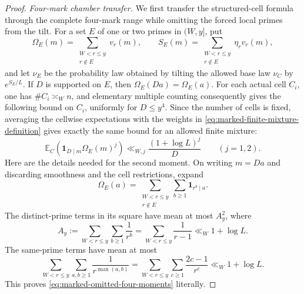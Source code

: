 \documentclass[11pt]{article}
\numberwithin{equation}{section}
\theoremstyle{definition}
\theoremstyle{remark}
\newcommand{\1}{\mathbf 1}
\begin{document}
\begin{proof}
\medskip\noindent\emph{Four-mark chamber transfer.}\quad
We first transfer the structured-cell formula through the complete
four-mark range while omitting the forced local primes from the tilt.
For a set \(E\) of one or two primes in \((W,y]\), put
\[
 \Omega_E(m)=\sum_{\substack{W<r\le y\\r\notin E}}v_r(m),
 \qquad
 S_E(m)=\sum_{\substack{W<r\le y\\r\notin E}}\eta_rv_r(m),
\]
and let \(\nu_E\) be the probability law obtained by tilting the allowed
base law \(\nu_C\) by \(e^{S_E/L}\).  If \(D\) is supported on \(E\),
then \(\Omega_E(Da)=\Omega_E(a)\).  For each actual cell \(C_i\), one has
\(\#C_i\asymp_W n\), and elementary multiple counting consequently gives
the following bound on \(C_i\), uniformly for \(D\le y^4\).  Since the
number of cells is fixed, averaging the cellwise expectations with the
weights in \eqref{eq:marked-finite-mixture-definition} gives exactly the
same bound for an allowed finite mixture:
\begin{equation}
 \mathbb E_C\!\left(\1_{D\mid m}\Omega_E(m)^j\right)
 \ll_{W,j}\frac{(1+\log L)^j}{D}\qquad(j=1,2).
 \label{eq:marked-omitted-four-moments}
\end{equation}
Here are the details needed for the second moment.  On writing \(m=Da\)
and discarding smoothness and the cell restrictions, expand
\[
 \Omega_E(a)=\sum_{\substack{W<r\le y\\r\notin E}}
                 \sum_{b\ge1}\1_{r^b\mid a}.
\]
The distinct-prime terms in its square have mean at most \(A_y^2\),
where
\[
 A_y:=\sum_{W<r\le y}\sum_{b\ge1}\frac1{r^b}
      =\sum_{W<r\le y}\frac1{r-1}\ll_W1+\log L.
\]
The same-prime terms have mean at most
\[
 \sum_{W<r\le y}\sum_{a,b\ge1}\frac1{r^{\max(a,b)}}
 =\sum_{W<r\le y}\sum_{c\ge1}\frac{2c-1}{r^c}
 \ll_W1+\log L.
\]
This proves \eqref{eq:marked-omitted-four-moments} literally.


\end{proof}
\end{document}
